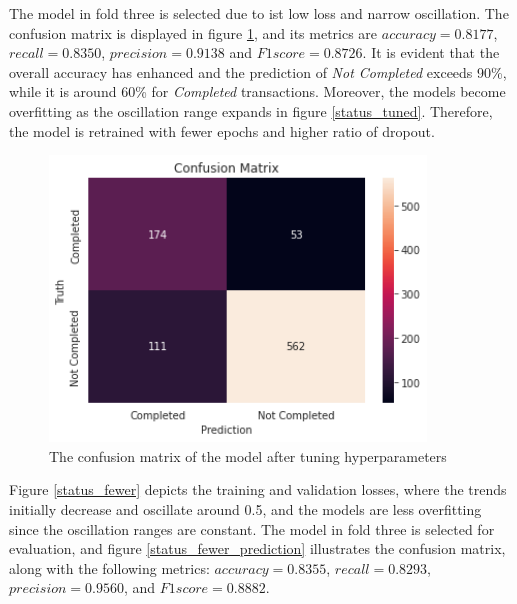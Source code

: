 \documentclass[12pt,twoside]{report}
\begin{document}
The model in fold three is selected due to ist low loss and narrow oscillation. The confusion matrix is displayed in figure \ref{status_tuned_prediction}, and its metrics are $accuracy = 0.8177$, $recall = 0.8350$, $precision = 0.9138$ and $F1 score = 0.8726$. It is evident that the overall accuracy has enhanced and the prediction of \textit{Not Completed} exceeds 90\%, while it is around 60\% for \textit{Completed} transactions. Moreover, the models become overfitting as the oscillation range expands in figure \ref{status_tuned}. Therefore, the model is retrained with fewer epochs and higher ratio of dropout. 
\\

\begin{figure}[!htbp]
	\centering
	\includegraphics[width=10cm]{cm_tuned}
	\caption{The confusion matrix of the model after tuning hyperparameters}
	\label{status_tuned_prediction}
\end{figure}

Figure \ref{status_fewer} depicts the training and validation losses, where the trends initially decrease and oscillate around 0.5, and the models are less overfitting since the oscillation ranges are constant. The model in fold three is selected for evaluation, and figure \ref{status_fewer_prediction} illustrates the confusion matrix, along with the following metrics: $accuracy = 0.8355$, $recall = 0.8293$, $precision = 0.9560$, and $F1 score = 0.8882$. 
\\
\end{document}
